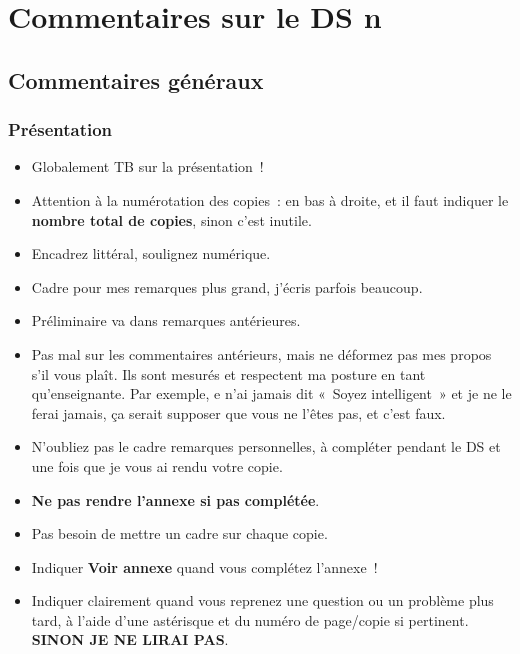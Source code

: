 \documentclass[a4paper, 11pt, final, garamond]{book}
\begin{document}
\setcounter{chapter}{0}

\def\lspace{25}

\chapter{Commentaires sur le DS n}
\section{Commentaires généraux}

\subsection{Présentation}

\begin{itemize}
  \item Globalement TB sur la présentation~!
  \item Attention à la numérotation des copies~: en bas à droite, et il faut
    indiquer le \textbf{nombre total de copies}, sinon c'est inutile.
  \item Encadrez littéral, soulignez numérique.
  \item Cadre pour mes remarques plus grand, j'écris parfois beaucoup.
  \item Préliminaire va dans remarques antérieures.
  \item Pas mal sur les commentaires antérieurs, mais ne déformez pas mes propos
    s'il vous plaît. Ils sont mesurés et respectent ma posture en tant
    qu'enseignante. Par exemple, e n'ai jamais dit «~Soyez intelligent~» et je
    ne le ferai jamais, ça serait supposer que vous ne l'êtes pas, et c'est
    faux.
  \item N'oubliez pas le cadre remarques personnelles, à compléter pendant le DS
    et une fois que je vous ai rendu votre copie.
  \item \textbf{Ne pas rendre l'annexe si pas complétée}.
  \item Pas besoin de mettre un cadre sur chaque copie.
  \item Indiquer \textbf{Voir annexe} quand vous complétez l'annexe~!
  \item Indiquer clairement quand vous reprenez une question ou un problème plus
    tard, à l'aide d'une astérisque et du numéro de page/copie si pertinent.
    \textbf{SINON JE NE LIRAI PAS}.
\end{itemize}
\end{document}
